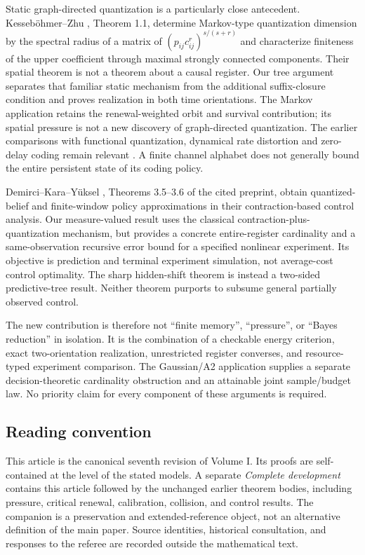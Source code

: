 Static graph-directed quantization is a particularly close antecedent.
Kesseb\"ohmer--Zhu \cite{KZ2017}, Theorem 1.1, determine Markov-type
quantization dimension by the spectral radius of a matrix of
$(p_{ij}c_{ij}^{r})^{s/(s+r)}$ and characterize finiteness of the upper
coefficient through maximal strongly connected components. Their
spatial theorem is not a theorem about a causal register. Our tree
argument separates that familiar static mechanism from the additional
suffix-closure condition and proves realization in both time
orientations. The Markov application retains the renewal-weighted orbit
and survival contribution; its spatial pressure is not a new discovery
of graph-directed quantization. The earlier comparisons with functional
quantization, dynamical rate distortion and zero-delay coding remain
relevant \cite{LuschgyPages2004,LinderYuksel2014,WoodLinderYuksel2017}.
A finite channel alphabet does not generally bound the entire persistent
state of its coding policy.

Demirci--Kara--Y\"uksel \cite{DKYAC2024}, Theorems 3.5--3.6 of the cited
preprint, obtain quantized-belief and finite-window policy approximations
in their contraction-based control analysis. Our measure-valued result
uses the classical contraction-plus-quantization mechanism, but provides
a concrete entire-register cardinality and a same-observation recursive
error bound for a specified nonlinear experiment. Its objective is
prediction and terminal experiment simulation, not average-cost control
optimality. The sharp hidden-shift theorem is instead a two-sided
predictive-tree result. Neither theorem purports to subsume general
partially observed control.

The new contribution is therefore not ``finite memory'', ``pressure'',
or ``Bayes reduction'' in isolation. It is the combination of a
checkable energy criterion, exact two-orientation realization, unrestricted
register converses, and resource-typed experiment comparison. The
Gaussian/A2 application supplies a separate decision-theoretic
cardinality obstruction and an attainable joint sample/budget law.
No priority claim for every component of these arguments is required.

\subsection{Reading convention}
This article is the canonical seventh revision of Volume I. Its proofs
are self-contained at the level of the stated models. A separate
\emph{Complete development} contains this article followed by the
unchanged earlier theorem bodies, including pressure, critical renewal,
calibration, collision, and control results. The companion is a
preservation and extended-reference object, not an alternative definition
of the main paper. Source identities, historical consultation, and
responses to the referee are recorded outside the mathematical text.
